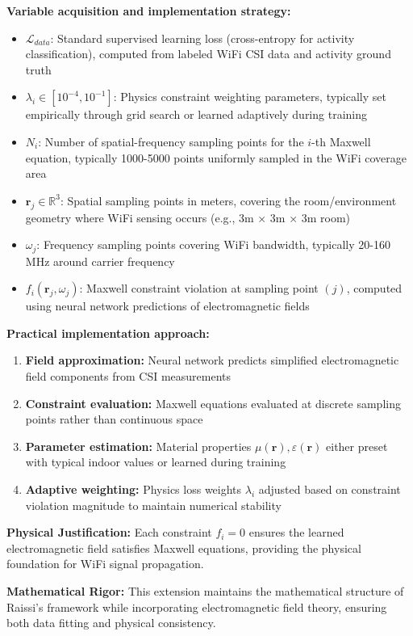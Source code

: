 \documentclass[12pt,a4paper]{article}
\begin{document}
\textbf{Variable acquisition and implementation strategy:}
\begin{itemize}
\item $\mathcal{L}_{data}$: Standard supervised learning loss (cross-entropy for activity classification), computed from labeled WiFi CSI data and activity ground truth
\item $\lambda_i \in [10^{-4}, 10^{-1}]$: Physics constraint weighting parameters, typically set empirically through grid search or learned adaptively during training
\item $N_i$: Number of spatial-frequency sampling points for the $i$-th Maxwell equation, typically 1000-5000 points uniformly sampled in the WiFi coverage area
\item $\mathbf{r}_j \in \mathbb{R}^3$: Spatial sampling points in meters, covering the room/environment geometry where WiFi sensing occurs (e.g., 3m × 3m × 3m room)
\item $\omega_j$: Frequency sampling points covering WiFi bandwidth, typically 20-160 MHz around carrier frequency
\item $f_i(\mathbf{r}_j, \omega_j)$: Maxwell constraint violation at sampling point $(j)$, computed using neural network predictions of electromagnetic fields
\end{itemize}

\textbf{Practical implementation approach:}
\begin{enumerate}
\item \textbf{Field approximation:} Neural network predicts simplified electromagnetic field components from CSI measurements
\item \textbf{Constraint evaluation:} Maxwell equations evaluated at discrete sampling points rather than continuous space
\item \textbf{Parameter estimation:} Material properties $\mu(\mathbf{r}), \varepsilon(\mathbf{r})$ either preset with typical indoor values or learned during training
\item \textbf{Adaptive weighting:} Physics loss weights $\lambda_i$ adjusted based on constraint violation magnitude to maintain numerical stability
\end{enumerate}

\textbf{Physical Justification:} Each constraint $f_i = 0$ ensures the learned electromagnetic field satisfies Maxwell equations, providing the physical foundation for WiFi signal propagation.

\textbf{Mathematical Rigor:} This extension maintains the mathematical structure of Raissi's framework while incorporating electromagnetic field theory, ensuring both data fitting and physical consistency.
\end{document}
